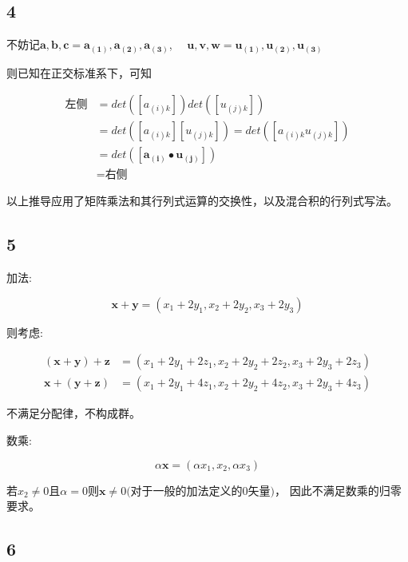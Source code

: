 \documentclass[UTF8,c5size]{ctexart}
\begin{document}
\subsection*{4}

不妨记$\bm{a},\bm{b},\bm{c}=\bm{a_{(1)}},\bm{a_{(2)}},\bm{a_{(3)}}$,  \ \ 
$\bm{u},\bm{v},\bm{w}=\bm{u_{(1)}},\bm{u_{(2)}},\bm{u_{(3)}}$

则已知在正交标准系下，可知

\begin{equation*}
    \begin{split}
        \text{左侧}&=det([a_{(i)k}])det([u_{(j)k}])\\
        &=det([a_{(i)k}][u_{(j)k}])=det([a_{(i)k}u_{(j)k}])\\
        &=det([\bm{a_{(i)}}\bullet\bm{u_{(j)}}])\\
        &=\text{右侧}
    \end{split}
\end{equation*}

以上推导应用了矩阵乘法和其行列式运算的交换性，以及混合积的行列式写法。

\subsection*{5}

加法:

$$
\bm{x}+\bm{y}=(x_1+2y_1,x_2+2y_2,x_3+2y_3)
$$

则考虑:

\begin{equation*}
    \begin{split}
        (\bm{x}+\bm{y})+\bm{z}&=(x_1+2y_1+2z_1,x_2+2y_2+2z_2,x_3+2y_3+2z_3)\\
        \bm{x}+(\bm{y}+\bm{z})&=(x_1+2y_1+4z_1,x_2+2y_2+4z_2,x_3+2y_3+4z_3)
    \end{split}
\end{equation*}

不满足分配律，不构成群。

数乘:

\begin{equation*}
    \alpha\bm{x}=(\alpha x_1, x_2, \alpha x_3)
\end{equation*}

若$x_2\neq 0$且$\alpha= 0$则$\bm{x}\neq 0\text{(对于一般的加法定义的0矢量)}$，
因此不满足数乘的归零要求。


\subsection*{6}
\end{document}
